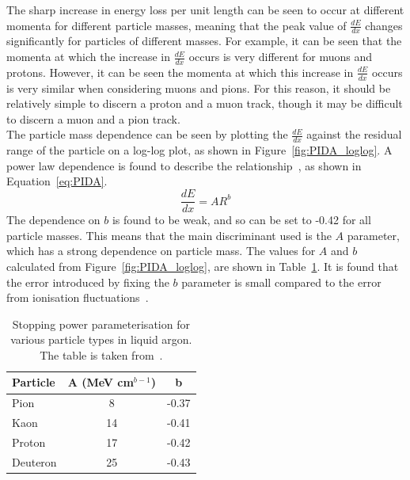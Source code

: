 The sharp increase in energy loss per unit length can be seen to occur at different momenta for different particle masses, meaning that the peak value of $\frac{dE}{dx}$ changes significantly for particles of different masses. For example, it can be seen that the momenta at which the increase in $\frac{dE}{dx}$ occurs is very different for muons and protons. However, it can be seen the momenta at which this increase in $\frac{dE}{dx}$ occurs is very similar when considering muons and pions. For this reason, it should be relatively simple to discern a proton and a muon track, though it may be difficult to discern a muon and a pion track. \\

The particle mass dependence can be seen by plotting the $\frac{dE}{dx}$ against the residual range of the particle on a log-log plot, as shown in Figure~\ref{fig:PIDA_loglog}. A power law dependence is found to describe the relationship~\citep{PIDA_Paper}, as shown in Equation~\ref{eq:PIDA}.
\begin{equation}
  \label{eq:PIDA}
  \frac{dE}{dx} = A R^b
\end{equation}
The dependence on $b$ is found to be weak, and so can be set to -0.42 for all particle masses. This means that the main discriminant used is the $A$ parameter, which has a strong dependence on particle mass. The values for $A$ and $b$ calculated from Figure~\ref{fig:PIDA_loglog}, are shown in Table~\ref{tab:PIDAVals}. It is found that the error introduced by fixing the $b$ parameter is small compared to the error from ionisation fluctuations~\citep{PIDA_Paper}. \\

\begin{table}
\caption[Stopping power parameterisation for various particle types in liquid argon]
        {Stopping power parameterisation for various particle types in liquid argon. The table is taken from~\citep{PIDA_Paper}.}
\centering
\label{tab:PIDAVals}
\begin{tabular}{l c c}
\toprule
{Particle} & {A (MeV cm$^{b-1}$)} & {b} \\ 
\midrule
Pion     & 8  & -0.37 \\

Kaon     & 14 & -0.41 \\

Proton   & 17 & -0.42 \\

Deuteron & 25 & -0.43 \\
\bottomrule
\end{tabular}
\end{table}

